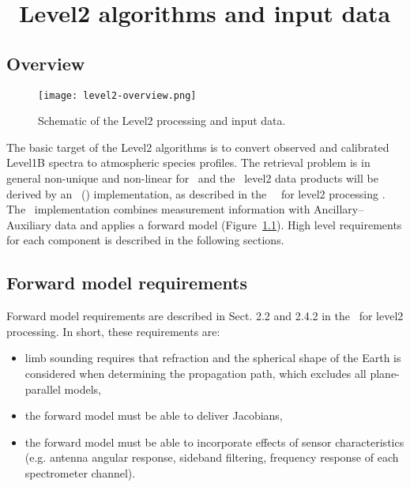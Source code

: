 \chapter{\smr\ Level2 algorithms and input data}
\label{level2-algorithms}
\section{Overview}


\begin{figure}[t]
\centering
\texttt{[image: level2-overview.png]}
\caption{Schematic of the Level2 processing and input data.}
\label{fig:level2}
\end{figure}

The basic target of the Level2 algorithms is to
convert observed and calibrated Level1B spectra
to atmospheric species profiles.
The retrieval problem is in general non-unique 
and non-linear for \smr\,  
and the \smr\ level2 data products will be derived by an
\OEMlong\ (\OEM) implementation, as described
in the \smr\ \ATBD\ for level2 processing \citep{atbdl2}.
The \OEM\ implementation combines measurement information with 
Ancillary--Auxiliary data and applies a forward 
model (Figure~\ref{fig:level2}). High level requirements for each 
component is described in the following sections.

\section{Forward model requirements}

Forward model requirements are described in Sect. 2.2
and 2.4.2 in the \ATBD\ for level2 processing.
In short, these requirements are:

\begin{itemize}

\item limb sounding requires that refraction and the spherical shape
of the Earth is considered when determining the propagation path,
which excludes all plane-parallel models,

\item the forward model must be able to deliver Jacobians,

\item the forward model must be able to incorporate effects of
sensor characteristics (e.g. antenna angular response, sideband filtering,
frequency response of each spectrometer channel).

\end{itemize}

